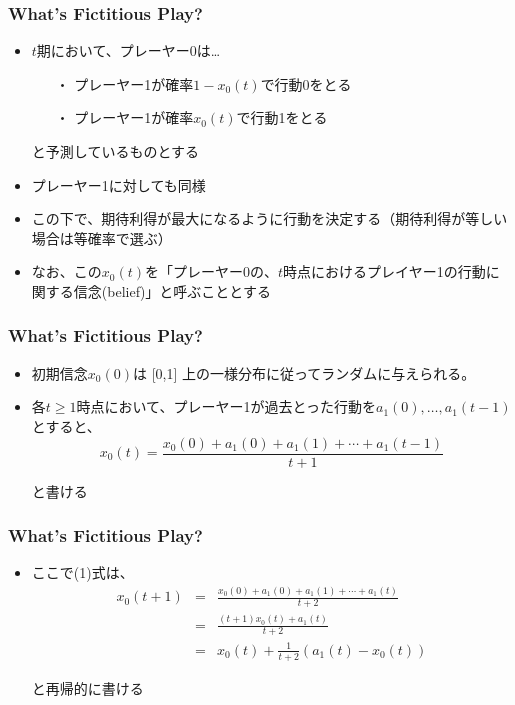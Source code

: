 \documentclass[dvipdfmx,11pt]{beamer}
\begin{document}
\begin{frame}\frametitle{What's Fictitious Play?}
 \begin{itemize}
  \item $t$期において、プレーヤー0は…
  \begin{itemize}
   \item[・] プレーヤー1が確率$1-x_{0}(t)$で行動0をとる
   \item[・] プレーヤー1が確率$x_{0}(t)$で行動1をとる
  \end{itemize}
  \item[] と予測しているものとする
  \item プレーヤー1に対しても同様
  \item この下で、期待利得が最大になるように行動を決定する（期待利得が等しい場合は等確率で選ぶ）
  \item なお、この$x_{0}(t)$を「プレーヤー0の、$t$時点におけるプレイヤー1の行動に関する信念(belief)」と呼ぶこととする
 \end{itemize}
\end{frame}

\begin{frame}\frametitle{What's Fictitious Play?}
 \begin{itemize}
  \item 初期信念$x_{0}(0)$は [0,1] 上の一様分布に従ってランダムに与えられる。
  \item 各$t \geq 1$時点において、プレーヤー1が過去とった行動を$a_{1}(0), \ldots ,a_{1}(t-1)$とすると、
  \begin{equation}
  x_{0}(t)=\frac{x_{0}(0)+a_{1}(0)+a_{1}(1)+\cdots+a_{1}(t-1)}{t+1}
  \end{equation}
  \item[] と書ける
  \end{itemize}
\end{frame}

\begin{frame}\frametitle{What's Fictitious Play?}
 \begin{itemize}
 \item ここで(1)式は、
  \begin{eqnarray*}
  x_{0}(t+1)&=&\frac{x_{0}(0)+a_{1}(0)+a_{1}(1)+\cdots+a_{1}(t)}{t+2}\\
  &=&\frac{(t+1)x_{0}(t)+a_{1}(t)}{t+2}\\
  &=&x_{0}(t)+\frac{1}{t+2}(a_{1}(t)-x_{0}(t))
  \end{eqnarray*}
  \item[] と再帰的に書ける
 \end{itemize}
\end{frame}
\end{document}

